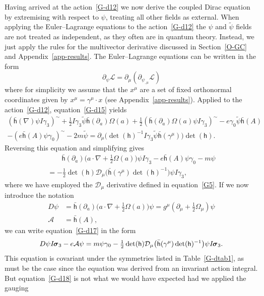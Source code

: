 \documentclass[a4paper]{article}
\numberwithin{equation}{section}
\newcommand{\dt}{\! \cdot \!}
\newcommand{\half}{{\textstyle \frac{1}{2}}}
\newcommand{\tld}{\sim}
\newcommand{\eqv}{=}
\newcommand{\sig}{\mbox{\boldmath $\sigma$}}
\newcommand{\Om}{\Omega}
\newcommand{\bsig}{\mbox{\boldmath $\sig$}}
\newcommand{\cla}{{\mathcal{A}}}
\newcommand{\cld}{{\mathcal{D}}}
\newcommand{\cll}{{\mathcal{L}}}
\newcommand{\da}{\partial_a}
\newcommand{\dmu}{\partial_{\mu}}
\newcommand{\dpsi}{\partial_{\psi}}
\newcommand{\isk}{I \hspace{-1pt} \bsig_3}
\newcommand{\gk}{\gamma_{3}}
\newcommand{\go}{\gamma_{0}}
\newcommand{\gamum}{\gamma^\mu}
\newcommand{\psirev}{\tilde{\psi}}
\newcommand{\lih}{\mathsf{h}}
\newcommand{\lbh}{\bar{\mathsf{h}}}
\newcommand{\ho}{\lbh}
\newcommand{\hu}{\lih}
\newcommand{\grad}{\nabla}
\newcommand{\dhi}{\det(\hu)^{-1}}
\renewcommand{\dh}{\det(\hu)}
\begin{document}
Having arrived at the action~\eqref{G-d12} we now derive the coupled Dirac
equation by extremising with respect to $\psi$, treating all other
fields as external.  When applying the Euler--Lagrange equations to the
action~\eqref{G-d12} the $\psi$ and $\psirev$ fields are not treated as
independent, as they often are in quantum theory.  Instead, we just
apply the rules for the multivector derivative discussed in
Section~\ref{O-GC} and Appendix~\ref{app-results}.  The Euler--Lagrange
equations can be written in the form
%
\begin{equation}
\dpsi \cll = \dmu (\partial_{\psi_{,\mu}} \cll)
\label{G-d15}
\end{equation}
%
where for simplicity we assume that the $x^\mu$ are a set of fixed
orthonormal coordinates given by $x^\mu = \gamum \dt x$ (see
Appendix~\ref{app-results}).  Applied to the action~\eqref{G-d12},
equation~\eqref{G-d15} yields
%
\begin{multline}
(\ho(\grad) \psi I\gk)^\tld + \half I\gk\psirev\ho(\da)\Om(a) + \half
(\ho(\da)\Om(a)\psi I\gk)^\tld - e\go \psirev \ho(A) \\
 - (e\ho(A) \psi \go)^\tld -2 m \psirev = \dmu \bigl( \dhi I\gk
\psirev \ho(\gamum) \bigr) \dh. 
\end{multline}
%
Reversing this equation and simplifying gives
%
\begin{multline}
\qquad \ho(\da)\bigl( a\dt\grad + \half \Om(a) \bigr) \psi I\gk
-e\ho(A)\psi\go -m \psi \\
= -\half \dh \cld_\mu  \bigl( \ho(\gamum) \dhi \bigr) \psi I\gk, \qquad
\label{G-d17}
\end{multline} 
%
where we have employed the $\cld_\mu$ derivative defined in
equation~\eqref{G5}.  If we now introduce the notation
%
\begin{align}
D \psi &\eqv \ho(\da)\bigl( a \dt \grad + \half \Om(a) \bigr) \psi =
g^\mu ( \dmu + \half \Om_\mu) \psi \\
\cla &\eqv  \ho(A),
\end{align}
%
we can write equation~\eqref{G-d17} in the form
%
\begin{equation}
D \psi \isk -e\cla \psi = m \psi \go -\half \dh \cld_\mu \bigl(
\ho(\gamum) \dhi \bigr) \psi \isk. 
\label{G-d18}
\end{equation}
%
This equation is covariant under the symmetries listed in
Table~\ref{G-dtab1}, as must be the case since the equation was
derived from an invariant action integral.  But equation~\eqref{G-d18}
is not what we would have expected had we applied the gauging
\end{document}
